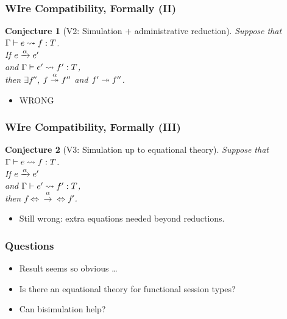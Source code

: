 \documentclass[aspectratio=169]{beamer}
\newtheorem{conjecture}{Conjecture}
\begin{document}
\begin{frame}
  \frametitle{WIre Compatibility, Formally (II)}
\begin{conjecture}[V2: Simulation $+$ administrative reduction]
  Suppose that $\translation {e}{f}T$. \\
  If $\reduce[\alpha]{e}{e'}$ \\
  and $\translation{e'}{f'}T$, \\
  \color{magenta}
  then $\exists f''$,  $\reducemany[\alpha]{f}{f''}$
  and $ \reducemany{f'}{f''}$.
\end{conjecture}
\begin{itemize}
\item<2-> WRONG
\end{itemize}
\end{frame}
\begin{frame}
  \frametitle{WIre Compatibility, Formally (III)}
\begin{conjecture}[V3: Simulation up to equational theory]
  Suppose that $\translation {e}{f}T$. \\
  If $\reduce[\alpha]{e}{e'}$ \\
  and $\translation{e'}{f'}T$, \\
  \color{magenta}
  then  $f \Leftrightarrow \xrightarrow{\alpha} \Leftrightarrow f'$.
\end{conjecture}
\begin{itemize}
\item<2-> Still wrong: extra equations needed beyond reductions.
\end{itemize}
\end{frame}
\begin{frame}
  \frametitle{Questions}
  \begin{itemize}
  \item Result seems so obvious \dots
  \item Is there an equational theory for functional session types?
  \item Can bisimulation help?
  \end{itemize}
\end{frame}
\end{document}
